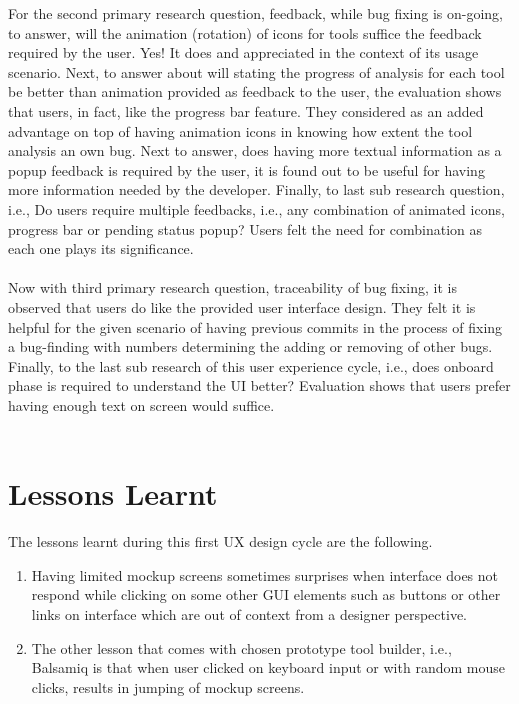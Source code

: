 For the second primary research question, feedback, while bug fixing is on-going, to answer, will the animation (rotation) of icons for tools suffice the feedback required by the user. Yes! It does and appreciated in the context of its usage scenario. Next, to answer about will stating the progress of analysis for each tool be better than animation provided as feedback to the user, the evaluation shows that users, in fact, like the progress bar feature.  They considered as an added advantage on top of having animation icons in knowing how extent the tool analysis an own bug. Next to answer, does having more textual information as a popup feedback is required by the user, it is found out to be useful for having more information needed by the developer. Finally, to last sub research question, i.e., Do users require multiple feedbacks, i.e., any combination of animated icons, progress bar or pending status popup? Users felt the need for combination as each one plays its significance. \\ \\

Now with third primary research question, traceability of bug fixing, it is observed that users do like the provided user interface design. They felt it is helpful for the given scenario of having previous commits in the process of fixing a bug-finding with numbers determining the adding or removing of other bugs. Finally, to the last sub research of this user experience cycle, i.e., does onboard phase is required to understand the UI better? Evaluation shows that users prefer having enough text on screen would suffice. \\ \\

\section{Lessons Learnt}

The lessons learnt during this first UX design cycle are the following. \\

\begin{enumerate}
\item Having limited mockup screens sometimes surprises when interface does not respond while clicking on some other GUI elements such as buttons or other links on interface which are out of context from a designer perspective.
\item The other lesson that comes with chosen prototype tool builder, i.e., Balsamiq is that when user clicked on keyboard input or with random mouse clicks, results in jumping of mockup screens.  \\ \\
\end{enumerate}


